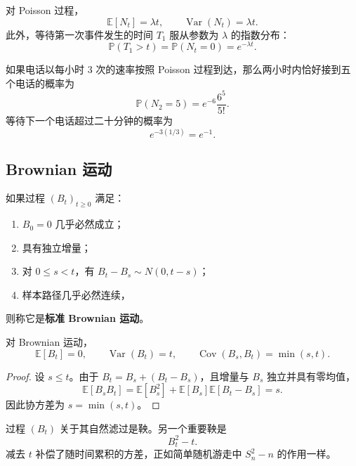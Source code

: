 \begin{proposition}
对 Poisson 过程，
\[
    \mathbb{E}[N_t]=\lambda t,
    \qquad
    \operatorname{Var}(N_t)=\lambda t.
\]
此外，等待第一次事件发生的时间 $T_1$ 服从参数为 $\lambda$ 的指数分布：
\[
    \mathbb{P}(T_1>t)=\mathbb{P}(N_t=0)=e^{-\lambda t}.
\]
\end{proposition}

\begin{example}
如果电话以每小时 $3$ 次的速率按照 Poisson 过程到达，那么两小时内恰好接到五个电话的概率为
\[
    \mathbb{P}(N_2=5)=e^{-6}\frac{6^5}{5!}.
\]
等待下一个电话超过二十分钟的概率为
\[
    e^{-3(1/3)}=e^{-1}.
\]
\end{example}

\subsection{Brownian 运动}

\begin{definition}[标准 Brownian 运动]
如果过程 $(B_t)_{t\geq0}$ 满足：
\begin{enumerate}
    \item $B_0=0$ 几乎必然成立；
    \item 具有独立增量；
    \item 对 $0\leq s<t$，有 $B_t-B_s\sim N(0,t-s)$；
    \item 样本路径几乎必然连续，
\end{enumerate}
则称它是\textbf{标准 Brownian 运动}。
\end{definition}

\begin{proposition}
对 Brownian 运动，
\[
    \mathbb{E}[B_t]=0,
    \qquad
    \operatorname{Var}(B_t)=t,
    \qquad
    \operatorname{Cov}(B_s,B_t)=\min(s,t).
\]
\end{proposition}

\begin{proof}
设 $s\leq t$。由于 $B_t=B_s+(B_t-B_s)$，且增量与 $B_s$ 独立并具有零均值，
\[
    \mathbb{E}[B_sB_t]
    =\mathbb{E}[B_s^2]
     +\mathbb{E}[B_s]\mathbb{E}[B_t-B_s]
    =s.
\]
因此协方差为 $s=\min(s,t)$。
\end{proof}

\begin{example}[Brownian 鞅]
过程 $(B_t)$ 关于其自然滤过是鞅。另一个重要鞅是
\[
    B_t^2-t.
\]
减去 $t$ 补偿了随时间累积的方差，正如简单随机游走中 $S_n^2-n$ 的作用一样。
\end{example}

